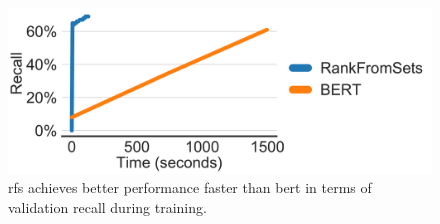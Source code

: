 \begin{figure}[!tb]
  \centering
  \includegraphics[width=0.95\linewidth]{fig/training-recall}
  \caption{\acrlong{rfs} achieves better performance faster than \acrshort{bert} in terms of validation recall during training.}
  \label{fig:training-recall}
\end{figure}